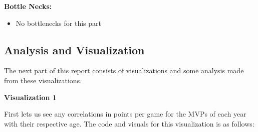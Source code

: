 \documentclass[11pt]{article}
\providecommand{\tightlist}{%
      \setlength{\itemsep}{0pt}\setlength{\parskip}{0pt}}
\begin{document}
\textbf{Bottle Necks:}

\begin{itemize}
\tightlist
\item
  No bottlenecks for this part
\end{itemize}

    \subsection{Analysis and
Visualization}\label{analysis-and-visualization}

The next part of this report consists of visualizations and some
analysis made from these visualizations. \newline

\textbf{Visualization 1} \newline

First lets us see any correlations in points per game for the MVPs of
each year with their respective age. The code and visuals for this
visualization is as follows:
\end{document}
